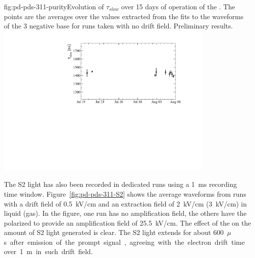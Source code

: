 \begin{dunefigure}{fig:pd-pds-311-purity}{Evolution of $\tau_{slow}$ over \num{15} days of operation of the . The points are the averages over the values extracted from the fits to the waveforms of the \num{3} negative base  for runs taken with no drift field. Preliminary results.}
\includegraphics[width=0.8\textwidth]{graphics/dppd_311_purity.pdf}
\end{dunefigure}

The S2 light has also been recorded in dedicated runs using a \SI{1}{ms} recording time window.
Figure~\ref{fig:pd-pds-311-S2} shows the average waveforms from runs with a drift field of \SI{0.5}{kV/cm} and an extraction field of \SI{2}{kV/cm} (\SI{3}{kV/cm}) in liquid (gas). In the figure, one run has no amplification field, the others have the  polarized to provide an amplification field of \SI{25.5}{kV/cm}. 
The effect of the  on the amount of S2 light generated is clear. 
The S2 light extends for about \SI{600}{$\mu$s} after emission of the prompt signal, agreeing with the electron drift time over \SI{1}{m} in such drift field.

